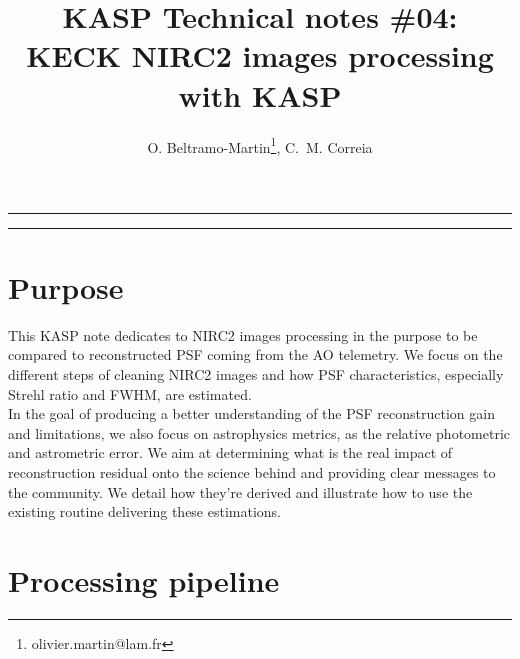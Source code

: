 \documentclass[12pt]{article}
\title{KASP Technical notes \#04:\\ KECK NIRC2 images processing with KASP}
\author{O. Beltramo-Martin\footnote{olivier.martin@lam.fr}, C.~M. Correia}
\date{}
\begin{document}
\maketitle

\rule{\columnwidth}{0.1mm}
\tableofcontents
\rule{\columnwidth}{0.1mm}
\section{Purpose}
This KASP note dedicates to NIRC2 images processing in the purpose to be compared to reconstructed PSF coming from the AO telemetry. We focus on the different steps of cleaning NIRC2 images and how PSF characteristics, especially Strehl ratio and FWHM, are estimated.\\

In the goal of producing a better understanding of the PSF reconstruction gain and limitations, we also focus on astrophysics metrics, as the relative photometric and astrometric error. We aim at determining what is the real impact of reconstruction residual onto the science behind and providing clear messages to the community. We detail how they're derived and illustrate how to use the existing routine delivering these estimations.

\section{Processing pipeline}
\end{document}
